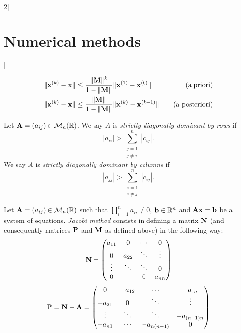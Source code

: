 \documentclass[../../../main.tex]{subfiles}
\begin{document}
\begin{multicols}{2}[\section{Numerical methods}]
\begin{prop}
    \begin{align*}
        \|\vb{x}^{(k)}-\vb{x}\|&\leq\frac{\|\vb{M}\|^k}{1-\|\vb{M}\|}\|\vb{x}^{(1)}-\vb{x}^{(0)}\|\quad&\text{(a priori)}\\
        \|\vb{x}^{(k)}-\vb{x}\|&\leq\frac{\|\vb{M}\|}{1-\|\vb{M}\|}\|\vb{x}^{(k)}-\vb{x}^{(k-1)}\|\quad&\text{(a posteriori)}
    \end{align*}
\end{prop}
\begin{definition}
    Let $\vb{A}=(a_{ij})\in\mathcal{M}_n(\mathbb{R})$. We say $A$ is \textit{strictly diagonally dominant by rows} if $$|a_{ii}|>\sum_{\substack{j=1\\j\ne i}}^n|a_{ij}|.$$
    We say $A$ is \textit{strictly diagonally dominant by columns} if $$|a_{jj}|>\sum_{\substack{i=1\\i\ne j}}^n|a_{ij}|.$$
\end{definition}
\begin{definition}
    Let $\vb{A}=(a_{ij})\in\mathcal{M}_n(\mathbb{R})$ such that $\prod_{i=1}^na_{ii}\ne 0$, $\vb{b}\in\mathbb{R}^n$ and $\vb{A}\vb{x}=\vb{b}$ be a system of equations. \textit{Jacobi method} consists in defining a matrix $\vb{N}$ (and consequently matrices $\vb{P}$ and $\vb{M}$ as defined above) in the following way:
    \begin{equation*}
        \vb{N}=
        \begin{pmatrix}
            a_{11} & 0 & \cdots & 0\\
            0 & a_{22} & \ddots & \vdots\\
            \vdots & \ddots & \ddots & 0\\
            0 & \cdots & 0 & a_{nn}
        \end{pmatrix}
    \end{equation*}
    \begin{equation*}
        \vb{P}=\vb{N}-\vb{A}=
        \begin{pmatrix}
            0 & -a_{12} & \cdots & -a_{1n}\\
            -a_{21} & 0 & \ddots & \vdots\\
            \vdots & \ddots & \ddots & -a_{(n-1)n}\\
            -a_{n1} & \cdots & -a_{n(n-1)} & 0
        \end{pmatrix}
    \end{equation*}

\end{definition}
\end{multicols}
\end{document}
